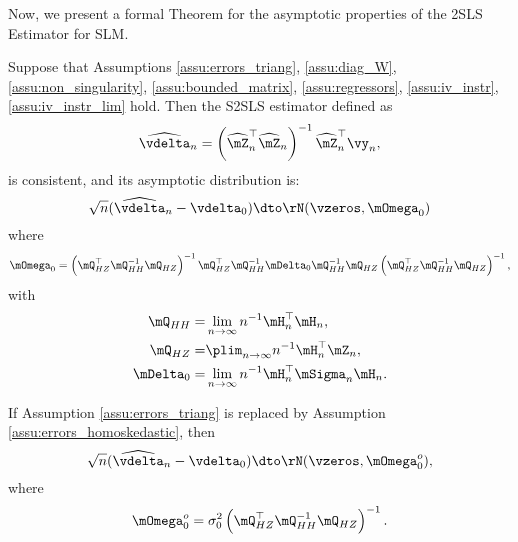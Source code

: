 Now, we present a formal Theorem for the asymptotic properties of the 2SLS Estimator for SLM.

\begin{theorem}\label{teo:S2SLS_est_slm}
  Suppose that Assumptions \ref{assu:errors_triang}, \ref{assu:diag_W},  \ref{assu:non_singularity}, \ref{assu:bounded_matrix}, \ref{assu:regressors}, \ref{assu:iv_instr}, \ref{assu:iv_instr_lim} hold. Then the S2SLS estimator defined as
  \begin{equation*}
    \widehat{\vdelta}_n = \left(\widehat{\mZ}_n^\top\widehat{\mZ}_n\right)^{-1}\widehat{\mZ}_n^\top\vy_n, 
  \end{equation*}
%
is consistent, and its asymptotic distribution is:
\begin{equation*}
\sqrt{n}(\widehat{\vdelta}_{n} - \vdelta_0) \dto \rN(\vzeros, \mOmega_0)
\end{equation*}
%
where
\begin{equation}\label{eq:var-cov-het-2sls}
\mOmega_0 = \left(\mQ_{HZ}^\top\mQ_{HH}^{-1}\mQ_{HZ}\right)^{-1}\mQ_{HZ}^\top\mQ_{HH}^{-1}\mDelta_0 \mQ_{HH}^{-1}\mQ_{HZ}\left(\mQ_{HZ}^\top\mQ_{HH}^{-1}\mQ_{HZ}\right)^{-1}, 
\end{equation}
%
with 
\begin{equation*}
\begin{aligned}
 \mQ_{HH} = &  \lim_{n\to \infty} n^{-1}\mH_n^\top\mH_n,\\
\mQ_{HZ}  = &  \plim_{n\to \infty} n^{-1}\mH_n^\top\mZ_n, \\
\mDelta_0 = & \lim_{n\to \infty} n^{-1}\mH_n^\top \mSigma_n \mH_n.
\end{aligned}
\end{equation*}

If Assumption \ref{assu:errors_triang} is replaced by Assumption \ref{assu:errors_homoskedastic}, then
\begin{equation*}
\sqrt{n}(\widehat{\vdelta}_{n} - \vdelta_0) \dto \rN(\vzeros, \mOmega_0^o),
\end{equation*}
%
where 
\begin{equation}\label{eq:var-cov-homo-2sls}
\mOmega_0^o = \sigma_{0}^2\left(\mQ_{HZ}^\top\mQ_{HH}^{-1}\mQ_{HZ}\right)^{-1}.
\end{equation}
\end{theorem}

